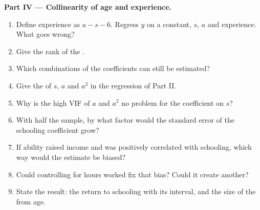 \begin{problem}
\medskip
\noindent\textbf{Part IV --- Collinearity of age and experience.}
\begin{enumerate}[resume]
  \item Define experience as $a - s - 6$. Regress $y$ on a constant, $s$, $a$ and experience. What goes wrong?
  \item Give the rank of the .
  \item Which combinations of the coefficients can still be estimated?
  \item Give the  of $s$, $a$ and $a^2$ in the regression of Part II.
  \item Why is the high VIF of $a$ and $a^2$ no problem for the coefficient on $s$?
  \item With half the sample, by what factor would the standard error of the schooling coefficient grow?
  \item If ability raised income and was positively correlated with schooling, which way would the estimate be biased?
  \item Could controlling for hours worked fix that bias? Could it create another?
  \item State the result: the return to schooling with its interval, and the size of the  from age.
\end{enumerate}
\end{problem}
